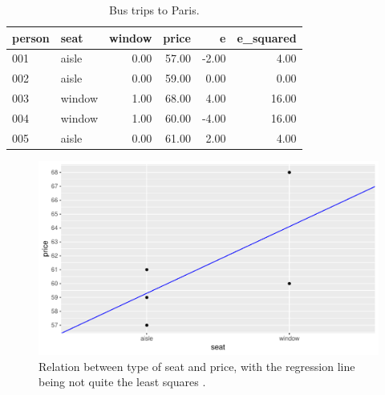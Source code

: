 \documentclass[]{report}\usepackage[]{graphicx}\usepackage[]{color}
\makeatletter
\def\maxwidth{ %
  \ifdim\Gin@nat@width>\linewidth
    \linewidth
  \else
    \Gin@nat@width
  \fi
}
\newenvironment{knitrout}{}{} %
\makeatother
\begin{document}
\begin{table}[ht]
\centering
\caption{Bus trips to Paris.} 
\label{tab:dummy_5}
\begin{tabular}{llrrrr}
  \hline
person & seat & window & price & e & e\_squared \\ 
  \hline
001 & aisle & 0.00 & 57.00 & -2.00 & 4.00 \\ 
  002 & aisle & 0.00 & 59.00 & 0.00 & 0.00 \\ 
  003 & window & 1.00 & 68.00 & 4.00 & 16.00 \\ 
  004 & window & 1.00 & 60.00 & -4.00 & 16.00 \\ 
  005 & aisle & 0.00 & 61.00 & 2.00 & 4.00 \\ 
   \hline
\end{tabular}
\end{table}




\begin{knitrout}
\color{fgcolor}\begin{figure}

{\centering \includegraphics[width=\maxwidth]{figure/dummy_6-1} 

}

\caption[Relation between type of seat and price, with the regression line being not quite the least squares ]{Relation between type of seat and price, with the regression line being not quite the least squares .}\label{fig:dummy_6}
\end{figure}


\end{knitrout}
\end{document}
